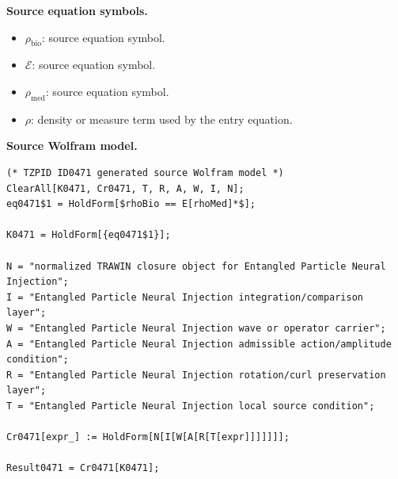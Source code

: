 \begin{minipage}[t]{0.49\linewidth}
\begingroup
\small
\raggedright
\textbf{Source equation symbols.}\par
\begin{itemize}[leftmargin=1.35em,itemsep=1pt,topsep=1pt,parsep=0pt]
    \item $\rho_{\mathrm{bio}}$: source equation symbol.
    \item $\mathcal{E}$: source equation symbol.
    \item $\rho_{\mathrm{med}}$: source equation symbol.
    \item $\rho$: density or measure term used by the entry equation.
\end{itemize}
\endgroup
\end{minipage}\hfill
\begin{minipage}[t]{0.47\linewidth}
\begingroup
\scriptsize
\raggedright
\textbf{Source Wolfram model.}\par
\begin{Verbatim}[fontsize=\tiny,breaklines=true,breakanywhere=true]
(* TZPID ID0471 generated source Wolfram model *)
ClearAll[K0471, Cr0471, T, R, A, W, I, N];
eq0471$1 = HoldForm[$rhoBio == E[rhoMed]*$];

K0471 = HoldForm[{eq0471$1}];

N = "normalized TRAWIN closure object for Entangled Particle Neural Injection";
I = "Entangled Particle Neural Injection integration/comparison layer";
W = "Entangled Particle Neural Injection wave or operator carrier";
A = "Entangled Particle Neural Injection admissible action/amplitude condition";
R = "Entangled Particle Neural Injection rotation/curl preservation layer";
T = "Entangled Particle Neural Injection local source condition";

Cr0471[expr_] := HoldForm[N[I[W[A[R[T[expr]]]]]]];

Result0471 = Cr0471[K0471];
\end{Verbatim}
\endgroup
\end{minipage}

